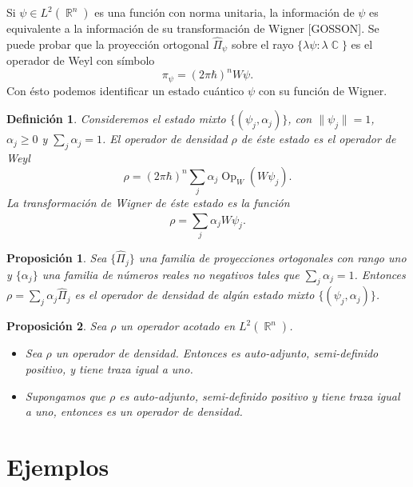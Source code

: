 \documentclass[a4paper]{report}
\DeclareMathOperator{\R}{\mathbb{R}}
\DeclareMathOperator{\C}{\mathbb{C}}
\DeclareMathOperator{\Op}{Op}
\newtheorem{definition}{Definición}
\newtheorem{proposition}{Proposición}
\begin{document}
  Si $\psi \in L^2(\R^{n})$ es una función con norma
  unitaria, la información de $\psi$ es equivalente a la
  información de su transformación de Wigner [GOSSON]. Se
  puede probar que la proyección ortogonal $\hat{\Pi}_\psi$ 
  sobre el rayo $\{\lambda \psi : \lambda \C\}$ es el
  operador de Weyl con símbolo
  \[
    \pi_\psi = (2\pi\hbar)^{n}W\psi.
  \] 
  Con ésto podemos identificar un estado cuántico $\psi$ con
  su función de Wigner.

  \begin{definition}
    Consideremos el estado mixto $\{(\psi_j,\alpha_j)\}$,
    con $\|\psi_j\| = 1$, $\alpha_j \geq 0$ y $\sum_{j}^{}
    \alpha_j = 1$. El operador de densidad $\rho$ de
    éste estado es el operador de Weyl
    \begin{equation}
      \rho
      = (2\pi\hbar)^{n} \sum_{j}^{} \alpha_j \Op_W(W\psi_j).
    \end{equation}
    La transformación de Wigner de éste estado es la función
    \begin{equation}
      \rho = \sum_{j}^{} \alpha_j W\psi_j.
    \end{equation}
  \end{definition}

  \begin{proposition}
    Sea $\{\hat{\Pi}_j\}$ una familia de proyecciones
    ortogonales con rango uno y $\{\alpha_j\}$ una familia
    de números reales no negativos tales que $\sum_j
    \alpha_j = 1$. Entonces $\rho = \sum_{j}^{}
    \alpha_j \hat{\Pi}_j$ es el operador de densidad de
    algún estado mixto $\{(\psi_j,\alpha_j)\}$.
  \end{proposition}

  \begin{proposition}
    Sea $\rho$ un operador acotado en $L^2(\R^{n})$.
    \begin{itemize}
      \item Sea $\rho$ un operador de densidad.
        Entonces es auto-adjunto, semi-definido positivo, y
        tiene traza igual a uno.
      \item Supongamos que $\rho$ es auto-adjunto,
        semi-definido positivo y tiene traza igual a uno,
        entonces es un operador de densidad.
    \end{itemize}
  \end{proposition}

  \section{Ejemplos}
\end{document}
